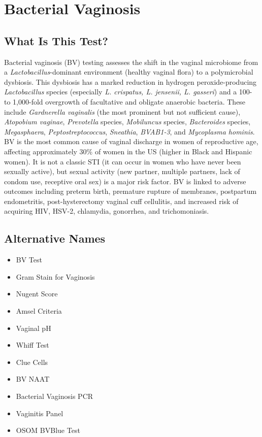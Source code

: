 \chapter{Bacterial Vaginosis}

\section*{What Is This Test?}
Bacterial vaginosis (BV) testing assesses the shift in the vaginal microbiome from a \textit{Lactobacillus}-dominant environment (healthy vaginal flora) to a polymicrobial dysbiosis. This dysbiosis has a marked reduction in hydrogen peroxide-producing \textit{Lactobacillus} species (especially \textit{L. crispatus, L. jensenii, L. gasseri}) and a 100- to 1,000-fold overgrowth of facultative and obligate anaerobic bacteria. These include \textit{Gardnerella vaginalis} (the most prominent but not sufficient cause), \textit{Atopobium vaginae}, \textit{Prevotella} species, \textit{Mobiluncus} species, \textit{Bacteroides} species, \textit{Megasphaera}, \textit{Peptostreptococcus}, \textit{Sneathia}, \textit{BVAB1-3}, and \textit{Mycoplasma hominis}. BV is the most common cause of vaginal discharge in women of reproductive age, affecting approximately 30\% of women in the US (higher in Black and Hispanic women). It is not a classic STI (it can occur in women who have never been sexually active), but sexual activity (new partner, multiple partners, lack of condom use, receptive oral sex) is a major risk factor. BV is linked to adverse outcomes including preterm birth, premature rupture of membranes, postpartum endometritis, post-hysterectomy vaginal cuff cellulitis, and increased risk of acquiring HIV, HSV-2, chlamydia, gonorrhea, and trichomoniasis.

\section*{Alternative Names}
\begin{itemize}
  \item BV Test
  \item Gram Stain for Vaginosis
  \item Nugent Score
  \item Amsel Criteria
  \item Vaginal pH
  \item Whiff Test
  \item Clue Cells
  \item BV NAAT
  \item Bacterial Vaginosis PCR
  \item Vaginitis Panel
  \item OSOM BVBlue Test
\end{itemize}
